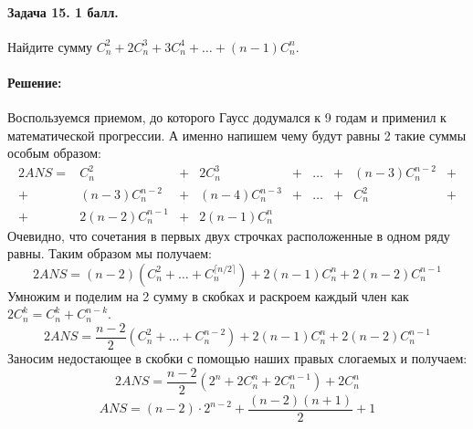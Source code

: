 \documentclass[12pt]{article}
\begin{document}
\paragraph{Задача 15. 1 балл.} Найдите сумму $ C_n^2 + 2C_n^3 + 3C_n^4 + \dots + (n-1)C_n^n $. 

\paragraph{\bf Решение:}
Воспользуемся приемом, до которого Гаусс додумался к 9 годам и применил к математической прогрессии.
А именно напишем чему будут равны 2 такие суммы особым образом:
$$ 
\begin{array}{rcccccccl}
2ANS 
 = & C_n^2          & + & 2C_n^3         & + & \dots & + &(n-3)C_n^{n-2} & + \\
 + & (n-3)C_n^{n-2} & + & (n-4)C_n^{n-3} & + & \dots & + & C_n^2         & + \\
 + & 2(n-2)C_n^{n-1}& + & 2(n-1)C_n^n 
\end{array}
$$
Очевидно, что сочетания в первых двух строчках расположенные в одном ряду равны. Таким образом мы получаем:
$$
2ANS = (n - 2) \left( C_n^2 + \dots + C_n^{\lceil n/2 \rceil}\right) + 2(n - 1)C_n^{n} + 2(n-2)C_n^{n-1}
$$
Умножим и поделим на 2 сумму в скобках и раскроем каждый член как $ 2C_n^k = C_n^k + C_n^{n - k} $.
$$
2ANS = \frac{n - 2}{2} \left( C_n^2 + \dots + C_n^{n-2} \right) + 2(n - 1)C_n^n + 2(n-2)C_n^{n-1}
$$
Заносим недостающее в скобки с помощью наших правых слогаемых и получаем:
$$
2ANS = \frac{n - 2}{2} \left(2^n + 2C_n^n + 2C_n^{n-1}\right) + 2C_n^n
$$
$$
ANS = (n-2)\cdot2^{n-2} + \frac{(n-2)(n+1)}{2} + 1
$$
\end{document}
